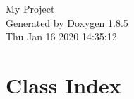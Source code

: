 \documentclass[twoside]{book}
\newcommand{\clearemptydoublepage}{%
  \newpage{\pagestyle{empty}\cleardoublepage}%
}
\begin{document}
\hypersetup{pageanchor=false}
\begin{titlepage}
\vspace*{7cm}
\begin{center}%
{\Large My Project }\\
\vspace*{1cm}
{\large Generated by Doxygen 1.8.5}\\
\vspace*{0.5cm}
{\small Thu Jan 16 2020 14:35:12}\\
\end{center}
\end{titlepage}
\clearemptydoublepage
\tableofcontents
\clearemptydoublepage
{}
\hypersetup{pageanchor=true}

\chapter{Class Index}

\end{document}
